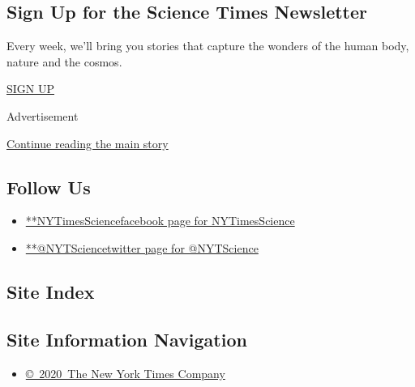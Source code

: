 \hypertarget{sign-up-for-the-science-times-newsletter}{%
\subsection{Sign Up for the Science Times
Newsletter}\label{sign-up-for-the-science-times-newsletter}}

Every week, we'll bring you stories that capture the wonders of the
human body, nature and the cosmos.

\href{/newsletters/signup/SC}{SIGN UP}

Advertisement

\protect\hyperlink{after-mktg}{Continue reading the main story}

\hypertarget{follow-us}{%
\subsection{Follow Us}\label{follow-us}}

\begin{itemize}
\tightlist
\item
  \href{https://www.facebook.com/NYTimesScience}{**NYTimesSciencefacebook
  page for NYTimesScience}
\item
  \href{https://twitter.com/NYTScience}{**@NYTSciencetwitter page for
  @NYTScience}
\end{itemize}

\hypertarget{site-index}{%
\subsection{Site Index}\label{site-index}}

\hypertarget{site-information-navigation}{%
\subsection{Site Information
Navigation}\label{site-information-navigation}}

\begin{itemize}
\tightlist
\item
  \href{https://help.nytimes.com/hc/en-us/articles/115014792127-Copyright-notice}{©~2020~The
  New York Times Company}
\end{itemize}

